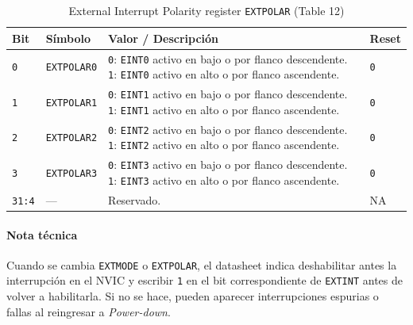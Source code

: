\begin{table}[H]
  \centering
  \small
  \renewcommand{\arraystretch}{1.15}
  \caption{External Interrupt Polarity register \texttt{EXTPOLAR} (Table 12)}
  \begin{tabularx}{0.96\textwidth}{|>{\centering\arraybackslash}p{}|>{\raggedright\arraybackslash}p{}|>{\raggedright\arraybackslash}X|>{\centering\arraybackslash}p{}|}
    \hline
    \textbf{Bit} & \textbf{S\'imbolo} & \textbf{Valor / Descripci\'on} & \textbf{Reset} \\
    \hline
    \texttt{0} & \texttt{EXTPOLAR0} & \texttt{0}: \texttt{EINT0} activo en bajo o por flanco descendente. \texttt{1}: \texttt{EINT0} activo en alto o por flanco ascendente. & \texttt{0} \\
    \hline
    \texttt{1} & \texttt{EXTPOLAR1} & \texttt{0}: \texttt{EINT1} activo en bajo o por flanco descendente. \texttt{1}: \texttt{EINT1} activo en alto o por flanco ascendente. & \texttt{0} \\
    \hline
    \texttt{2} & \texttt{EXTPOLAR2} & \texttt{0}: \texttt{EINT2} activo en bajo o por flanco descendente. \texttt{1}: \texttt{EINT2} activo en alto o por flanco ascendente. & \texttt{0} \\
    \hline
    \texttt{3} & \texttt{EXTPOLAR3} & \texttt{0}: \texttt{EINT3} activo en bajo o por flanco descendente. \texttt{1}: \texttt{EINT3} activo en alto o por flanco ascendente. & \texttt{0} \\
    \hline
    \texttt{31:4} & --- & Reservado. & NA \\
    \hline
  \end{tabularx}
\end{table}

\paragraph{Nota t\'ecnica}
Cuando se cambia \texttt{EXTMODE} o \texttt{EXTPOLAR}, el datasheet indica deshabilitar antes la interrupci\'on en el NVIC y escribir \texttt{1} en el bit correspondiente de \texttt{EXTINT} antes de volver a habilitarla. Si no se hace, pueden aparecer interrupciones espurias o fallas al reingresar a \textit{Power-down}.

